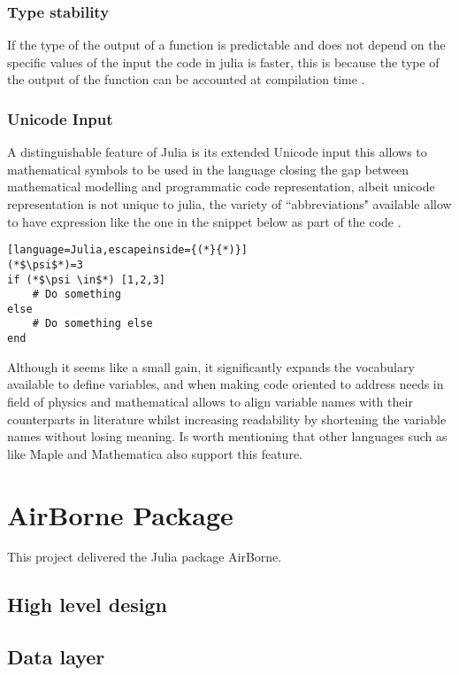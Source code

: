 \subsubsection{Type stability}
If the type of the output of a function is predictable and does not depend on the specific values of the input the code in julia is faster, this is because the type of the output of the function can be accounted at compilation time \cite{julia_performance_tips, julia_qa_stability}.

\subsubsection{Unicode Input}
A distinguishable feature of Julia is its extended Unicode input this allows to mathematical symbols to be used in the language closing the gap between mathematical modelling and programmatic code representation, albeit unicode representation is not unique to julia, the variety of ``abbreviations" available allow to have expression like the one in the snippet below as part of the code \cite{julia_unicode_input}.

\begin{lstlisting}[language=Julia,escapeinside={(*}{*)}]
(*$\psi$*)=3 
if (*$\psi \in$*) [1,2,3]
    # Do something
else 
    # Do something else
end
\end{lstlisting}

Although it seems like a small gain, it significantly expands the vocabulary available to define variables, and when making code oriented to address needs in field of physics and mathematical allows to align variable names with their counterparts in literature whilst increasing readability by shortening the variable names without losing meaning. Is worth mentioning that other languages such as like Maple and Mathematica also support this feature.



\section{AirBorne Package}
This project delivered the Julia package AirBorne\cite{AirBorne}.

\subsection{High level design}

\subsection{Data layer} 

